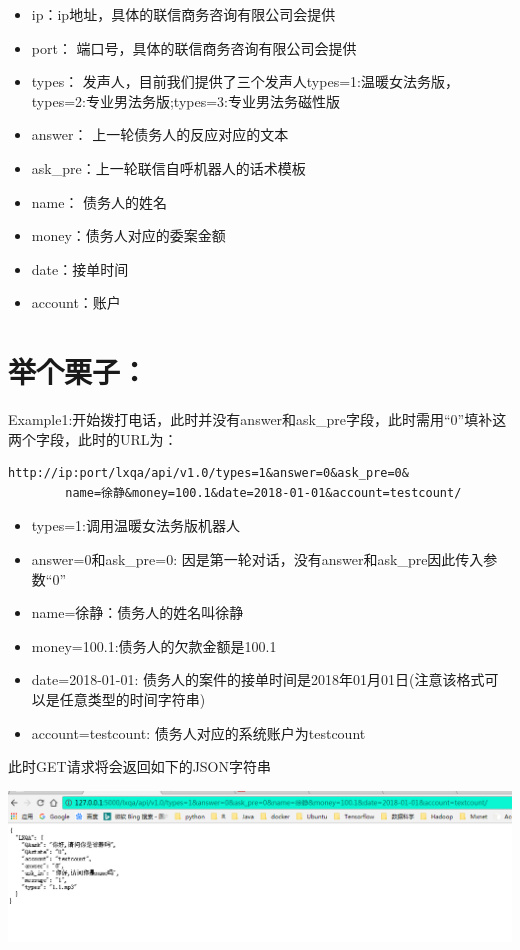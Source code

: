 \documentclass[]{book}
\begin{document}
\begin{itemize}
\item
  ip：ip地址，具体的联信商务咨询有限公司会提供
\item
  port： 端口号，具体的联信商务咨询有限公司会提供
\item
  types：
  发声人，目前我们提供了三个发声人types=1:温暖女法务版，types=2:专业男法务版;types=3:专业男法务磁性版
\item
  answer： 上一轮债务人的反应对应的文本
\item
  ask\_pre：上一轮联信自呼机器人的话术模板
\item
  name： 债务人的姓名
\item
  money：债务人对应的委案金额
\item
  date：接单时间
\item
  account：账户
\end{itemize}

\section{\texorpdfstring{\textbf{举个栗子：}}{举个栗子：}}

Example1:开始拨打电话，此时并没有answer和ask\_pre字段，此时需用``0''填补这两个字段，此时的URL为：

\begin{verbatim}
http://ip:port/lxqa/api/v1.0/types=1&answer=0&ask_pre=0&
        name=徐静&money=100.1&date=2018-01-01&account=testcount/
\end{verbatim}

\begin{itemize}
\item
  types=1:调用温暖女法务版机器人
\item
  answer=0和ask\_pre=0:
  因是第一轮对话，没有answer和ask\_pre因此传入参数``0''
\item
  name=徐静：债务人的姓名叫徐静
\item
  money=100.1:债务人的欠款金额是100.1
\item
  date=2018-01-01:
  债务人的案件的接单时间是2018年01月01日(注意该格式可以是任意类型的时间字符串)
\item
  account=testcount: 债务人对应的系统账户为testcount
\end{itemize}

此时GET请求将会返回如下的JSON字符串

\begin{center}\includegraphics[width=1.5\linewidth,height=1.5\textheight]{img/2-1} \end{center}
\end{document}
